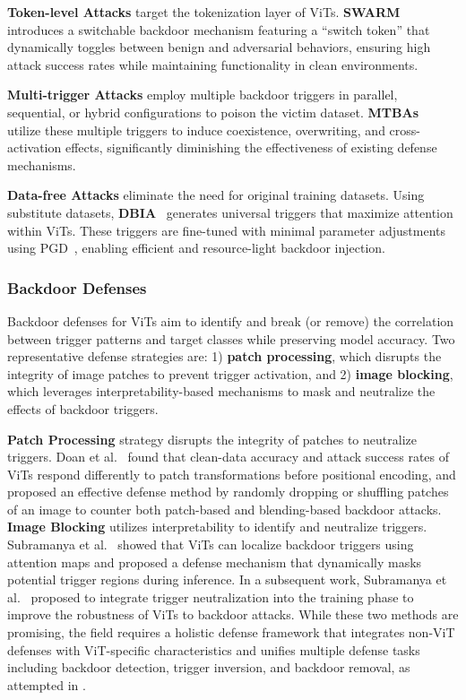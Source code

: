 \textbf{Token-level Attacks} target the tokenization layer of ViTs. \textbf{SWARM}~\cite{yang2024not} introduces a switchable backdoor mechanism featuring a ``switch token'' that dynamically toggles between benign and adversarial behaviors, ensuring high attack success rates while maintaining functionality in clean environments.

\textbf{Multi-trigger Attacks} employ multiple backdoor triggers in parallel, sequential, or hybrid configurations to poison the victim dataset.
\textbf{MTBAs}~\cite{li2024multi} utilize these multiple triggers to induce coexistence, overwriting, and cross-activation effects, significantly diminishing the effectiveness of existing defense mechanisms.

\textbf{Data-free Attacks} eliminate the need for original training datasets. Using substitute datasets, \textbf{DBIA}~\cite{lv2023dbia} generates universal triggers that maximize attention within ViTs. These triggers are fine-tuned with minimal parameter adjustments using PGD~\cite{madry2017towards}, enabling efficient and resource-light backdoor injection.




\subsubsection{Backdoor Defenses}\label{sec:ViT-backdoordefense}
Backdoor defenses for ViTs aim to identify and break (or remove) the correlation between trigger patterns and target classes while preserving model accuracy.
Two representative defense strategies are: 1) \textbf{patch processing}, which disrupts the integrity of image patches to prevent trigger activation, and 2) \textbf{image blocking}, which leverages interpretability-based mechanisms to mask and neutralize the effects of backdoor triggers.

\textbf{Patch Processing} strategy disrupts the integrity of patches to neutralize triggers.
Doan et al.~\cite{doan2023defending} found that clean-data accuracy and attack success rates of ViTs respond differently to patch transformations before positional encoding, and proposed an effective defense method by randomly dropping or shuffling patches of an image to counter both patch-based and blending-based backdoor attacks.
\textbf{Image Blocking} utilizes interpretability to identify and neutralize triggers.
Subramanya et al.~\cite{subramanya2022backdoor} showed that ViTs can localize backdoor triggers using attention maps and proposed a defense mechanism that dynamically masks potential trigger regions during inference.
In a subsequent work, Subramanya et al.~\cite{subramanya2024closer} proposed to integrate trigger neutralization into the training phase to improve the robustness of ViTs to backdoor attacks. 
While these two methods are promising, the field requires a holistic defense framework that integrates non-ViT defenses with ViT-specific characteristics and unifies multiple defense tasks including backdoor detection, trigger inversion, and backdoor removal, as attempted in \cite{li2024expose}.




